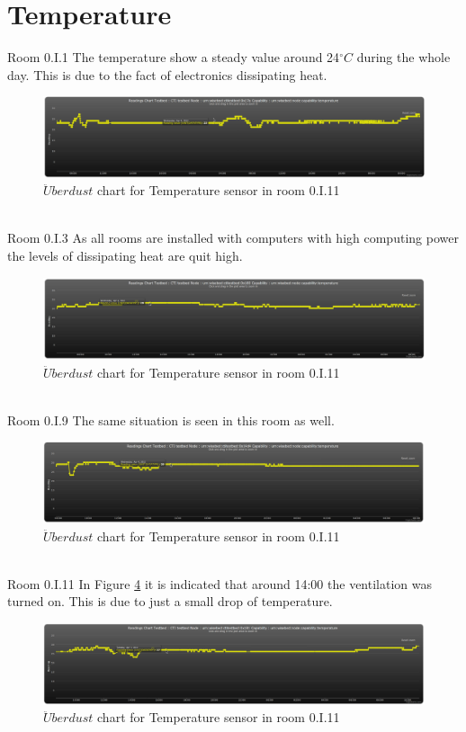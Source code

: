\documentclass[12pt,a4paper,draft]{report}
\begin{document}
\section{Temperature}
%
{Room 0.I.1}
%
The temperature show a steady value around 24$^\circ C$ during the whole day. This is due to the fact of electronics dissipating heat.
\begin{figure}[H]
\centering
\includegraphics*[scale=0.3]{temp_1}
\caption{$\ddot{U}berdust$ chart for Temperature sensor in room 0.I.11}
\label{chart_temp_1}
\end{figure}
\ \\
%
{Room 0.I.3}
%
As all rooms are installed with computers with high computing power the levels of dissipating heat are quit high.
\begin{figure}[H]
\centering
\includegraphics*[scale=0.3]{temp_3}
\caption{$\ddot{U}berdust$ chart for Temperature sensor in room 0.I.11}
\label{chart_temp_3}
\end{figure}
\ \\
%
{Room 0.I.9}
%
The same situation is seen in this room as well.
\begin{figure}[H]
\centering
\includegraphics*[scale=0.3]{temp_9}
\caption{$\ddot{U}berdust$ chart for Temperature sensor in room 0.I.11}
\label{chart_temp_9}
\end{figure}
\ \\
%
{Room 0.I.11}
%
In Figure \ref{chart_temp_11} it is indicated that around 14:00 the ventilation was turned on. This is due to just a small drop of temperature.
\begin{figure}[H]
\centering
\includegraphics*[scale=0.3]{temp_11}
\caption{$\ddot{U}berdust$ chart for Temperature sensor in room 0.I.11}
\label{chart_temp_11}
\end{figure}
\ \\
%
\end{document}
